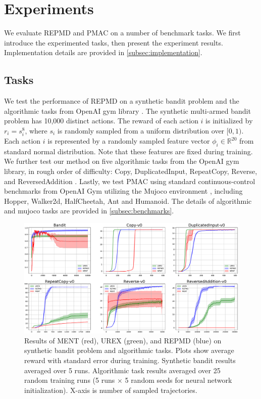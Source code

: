 
\section{Experiments}
\label{sec:experiments}

We evaluate REPMD and PMAC on a number of benchmark tasks. We first introduce the experimented tasks, then present the experiment results. Implementation details are provided in \cref{subsec:implementation}. 

\subsection{Tasks}
\label{subsec:tasks}
We test the performance of REPMD on a synthetic bandit problem and the algorithmic tasks from OpenAI gym library \citep{brockman2016openai}. The synthetic multi-armed bandit problem has 10,000 distinct actions. The reward of each action $i$ is initialized by $r_i = s_i^{8}$, where $s_i$ is randomly sampled from a uniform distribution over $[0,1)$. Each action $i$ is represented by a randomly sampled feature vector $\phi_i\in \mathbb{R}^{20}$ from standard normal distribution. Note that these features are fixed during training. We further test our method on five algorithmic tasks from the OpenAI gym library, in rough order of difficulty: Copy, DuplicatedInput, RepeatCopy, Reverse, and ReversedAddition \citep{brockman2016openai}. Lastly, we test PMAC using standard continuous-control benchmarks from OpenAI Gym utilizing the Mujoco environment \citep{brockman2016openai,todorov2012mujoco}, including Hopper, Walker2d, HalfCheetah, Ant and Humanoid. The details of algorithmic and mujoco tasks are provided in \cref{subsec:benchmarks}. 

\begin{figure}[t]
\begin{center}
\includegraphics[width=0.8\linewidth]{./fig1.pdf}
\end{center}
\caption{
Results of MENT (red), UREX (green), and REPMD (blue) on synthetic bandit problem and algorithmic tasks. Plots show average reward with standard error during training. Synthetic bandit results averaged over 5 runs. Algorithmic task results averaged over 25 random training runs (5 runs $\times$ 5 random seeds for neural network initialization). X-axis is number of sampled trajectories. } 
\label{fig:results}
\end{figure}


